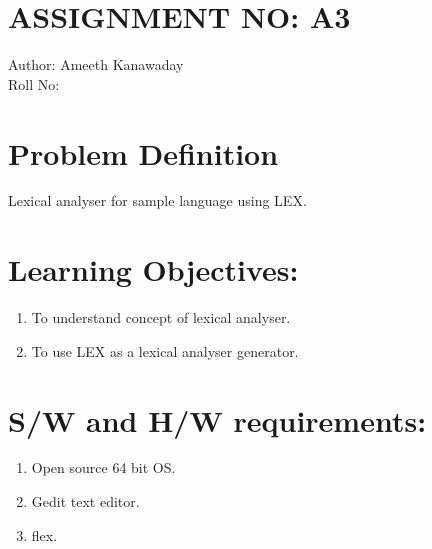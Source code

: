 \documentclass[10pt,a4paper]{article}
\begin{document}
\section{ASSIGNMENT NO: A3}
Author:\:   Ameeth Kanawaday\\
Roll No:\\
\section{Problem Definition}
Lexical analyser for sample language using LEX.

\section{Learning Objectives:}
\begin{enumerate}
\item To understand concept of lexical analyser.
\item To use LEX as a lexical analyser generator.
\end{enumerate}

\section{S/W and H/W requirements:}
\begin{enumerate}
\item Open source 64 bit OS.
\item Gedit text editor.
\item flex.
\end{enumerate}
\end{document}
